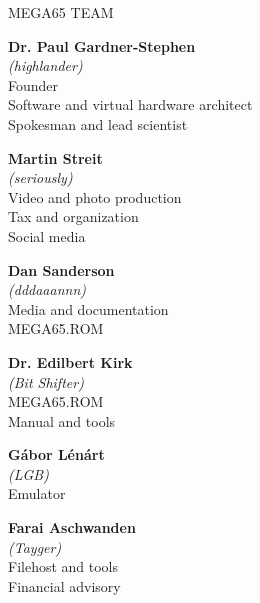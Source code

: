 \newpage
{\huge MEGA65 TEAM}\vspace{1cm}

\begin{mega65thanks}

\begin{minipage}{\linewidth}
    {\large\bf Dr. Paul Gardner-Stephen} \\
    \textit{(highlander)} \\
    Founder \\
    Software and virtual hardware architect \\
    Spokesman and lead scientist
\end{minipage}

\begin{minipage}{\linewidth}
    {\large\bf Martin Streit} \\
    \textit{(seriously)} \\
    Video and photo production \\
    Tax and organization \\
    Social media
\end{minipage}

\begin{minipage}{\linewidth}
    {\large\bf Dan Sanderson} \\
    \textit{(dddaaannn)} \\
    Media and documentation \\
    MEGA65.ROM
\end{minipage}

\begin{minipage}{\linewidth}
    {\large\bf Dr. Edilbert Kirk} \\
    \textit{(Bit Shifter)} \\
    MEGA65.ROM \\
    Manual and tools
\end{minipage}

\begin{minipage}{\linewidth}
    {\large\bf Gábor Lénárt} \\
    \textit{(LGB)} \\
    Emulator
\end{minipage}

\begin{minipage}{\linewidth}
    {\large\bf Farai Aschwanden} \\
    \textit{(Tayger)} \\
    Filehost and tools \\
    Financial advisory
\end{minipage}


\end{mega65thanks}
